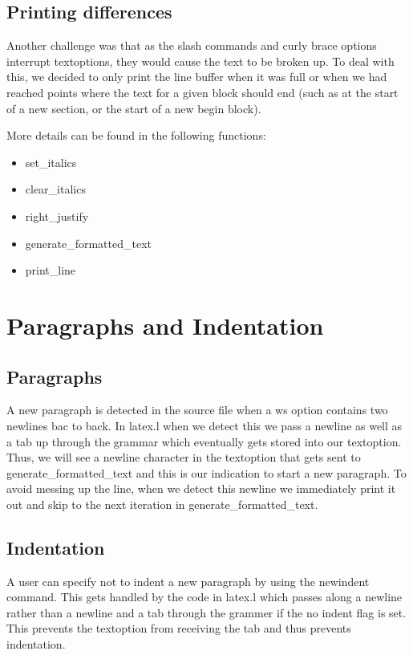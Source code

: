 \subsection{Printing differences}
Another challenge was that as the slash commands and curly brace options interrupt
textoptions, they would cause the text to be broken up. To deal with this, we decided
to only print the line buffer when it was full or when we had reached points where the
text for a given block should end (such as at the start of a new section, or the start
of a new begin block). 

More details can be found in the following functions:
\begin{itemize}
\item set_italics
\item clear_italics
\item right_justify
\item generate_formatted_text
\item print_line
\end{itemize}

\section{Paragraphs and Indentation}

\subsection{Paragraphs}
A new paragraph is detected in the source file when a ws option contains two newlines bac
to back. In latex.l when we detect this we pass a newline as well as a tab up through the
grammar which eventually gets stored into our textoption. Thus, we will see a newline
character in the textoption that gets sent to generate_formatted_text and this is our 
indication to start a new paragraph. To avoid messing up the line, when we detect this
newline we immediately print it out and skip to the next iteration in
generate_formatted_text. 

\subsection{Indentation}
A user can specify not to indent a new paragraph by using the newindent command. This gets
handled by the code in latex.l which passes along a newline rather than a newline and a tab
through the grammer if the no indent flag is set. This prevents the textoption from
receiving the tab and thus prevents indentation.

